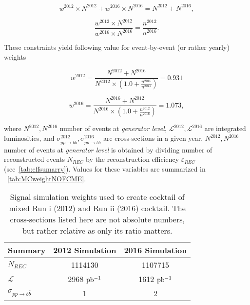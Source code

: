 \begin{equation}
w^{2012} \times N^{2012} + w^{2016} \times N^{2016} = N^{2012} + N^{2016},
\end{equation}

\begin{equation}
\frac{w^{2012} \times N^{2012}}{w^{2016} \times N^{2016}} = \frac{n^{2012}}{n^{2016}}.
\end{equation}

These constraints yield following value for event-by-event (or rather yearly) weights


\begin{equation}
w^{2012}= \frac{N^{2012}+N^{2016}}{N^{2012}\times(1.0+\frac{n^{2016}}{n^{2012}})}=0.931
\end{equation}


\begin{equation}
w^{2016}= \frac{N^{2016}+N^{2012}}{N^{2016}\times(1.0+ \frac{n^{2012}}{n^{2016}})}=1.073,
\end{equation}



where $N^{2012},N^{2016}$ number of events at \textit{generator level}, $\mathcal{L}^{2012},\mathcal{L}^{2016}$ are integrated luminosities, and $\sigma^{2012}_{pp \rightarrow b \overline{b}}, \sigma^{2016}_{pp \rightarrow b \overline{b}}$ are cross-sections in a given year. $N^{2012},N^{2016}$ number of events at \textit{generator level} is obtained by dividing number of reconstructed events $N_{REC}$ by the reconstruction efficiency $\varepsilon_{REC}$ (see~\autoref{tab:effsumarry}). Values for these variables are summarized in ~\autoref{tab:MCweightNOFCME}.


\begin{table}[h]
\centering
\begin{tabular}{ l  c  c }
\toprule
Summary & 2012 Simulation & 2016 Simulation \\
\midrule


$N_{REC}$  & 1114130 & 1107715 \\
$\mathcal{L}$ & 2968 $\rm{pb^{-1}}$ & 1612 $\rm{pb^{-1}}$ \\
$\sigma_{pp \rightarrow b \overline{b}}$ & 1 & 2  \\
\bottomrule
\end{tabular}
	\caption{Signal simulation weights used to create cocktail of mixed Run \Rn{1} (2012) and Run \Rn{2} (2016) cocktail. The cross-sections listed here are not absolute numbers, but rather relative as only its ratio matters.}
\label{tab:MCweightNOFCME}
\end{table}


